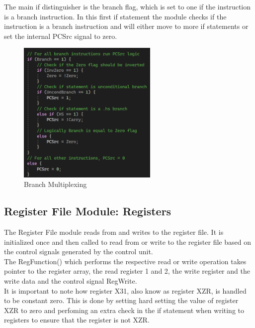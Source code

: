 \documentclass{article}
\begin{document}
The main if distinguisher is the branch flag, which is set to one if the instruction is a branch instruction. In this first if statement the module checks if the instruction is a branch instruction and will either move to more if statements or set the internal PCSrc signal to zero.\\

\begin{figure}[htbp]
    \centering
    \includegraphics[width=0.6\textwidth]{screen_dumps/multiplexing_branch.png}
    \caption{Branch Multiplexing}
    \label{fig:3}
\end{figure}

\subsection{Register File Module: Registers}
The Register File module reads from and writes to the register file. It is initialized once and then called to read from or write to the register file based on the control signals generated by the control unit.\\

The RegFunction() which performs the respective read or write operation takes pointer to the register array, the read register 1 and 2, the write register and the write data and the control signal RegWrite.\\

It is important to note how register X31, also know as register XZR, is handled to be constant zero. This is done by setting hard setting the value of register XZR to zero and perfoming an extra check in the if statement when writing to registers to ensure that the register is not XZR.\\
\end{document}
